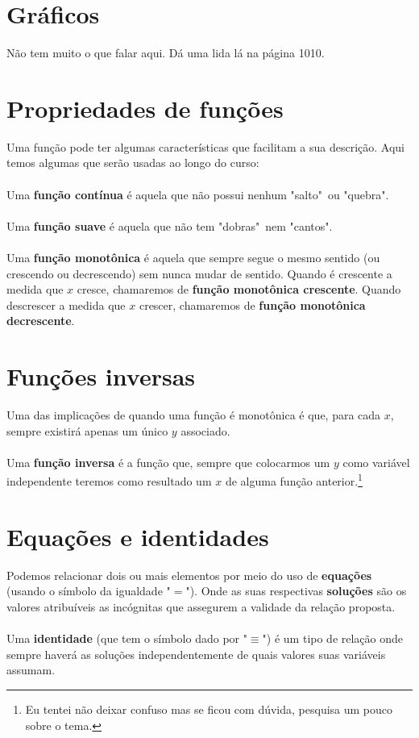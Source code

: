 \documentclass[a4paper,11pt,oneside]{book}
\theoremstyle{definition}
\theoremstyle{break}
\begin{document}
\section{Gráficos}

Não tem muito o que falar aqui. Dá uma lida lá na página 1010.

\section{Propriedades de funções}

Uma função pode ter algumas características que facilitam a sua descrição. Aqui temos algumas que serão usadas ao longo do curso:
\\
\\
Uma \textbf{função contínua} é aquela que não possui nenhum "salto"\ ou "quebra". 
\\
\\
Uma \textbf{função suave} é aquela que não tem "dobras"\ nem "cantos".
\\
\\
Uma \textbf{função monotônica} é aquela que sempre segue o mesmo sentido (ou crescendo ou decrescendo) sem nunca mudar de sentido. 
Quando é crescente a medida que $x$ cresce, chamaremos de \textbf{função monotônica crescente}. Quando descrescer a medida que $x$ crescer, chamaremos de \textbf{função monotônica decrescente}.

\section{Funções inversas}

Uma das implicações de quando uma função é monotônica é que, para cada $x$, sempre existirá apenas um único $y$ associado. 
\\
\\
Uma \textbf{função inversa} é a função que, sempre que colocarmos um $y$ como variável independente teremos como resultado um $x$ de alguma função anterior.\footnote{Eu tentei não deixar confuso mas se ficou com dúvida, pesquisa um pouco sobre o tema.}

\section{Equações e identidades}

Podemos relacionar dois ou mais elementos por meio do uso de \textbf{equações} (usando o símbolo da igualdade "$=$"). Onde as suas respectivas \textbf{soluções} são os valores atribuíveis as incógnitas que assegurem a validade da relação proposta.
\\
\\
Uma \textbf{identidade} (que tem o símbolo dado por "$\equiv$") é um tipo de relação onde sempre haverá as soluções independentemente de quais valores suas variáveis assumam.
\end{document}
